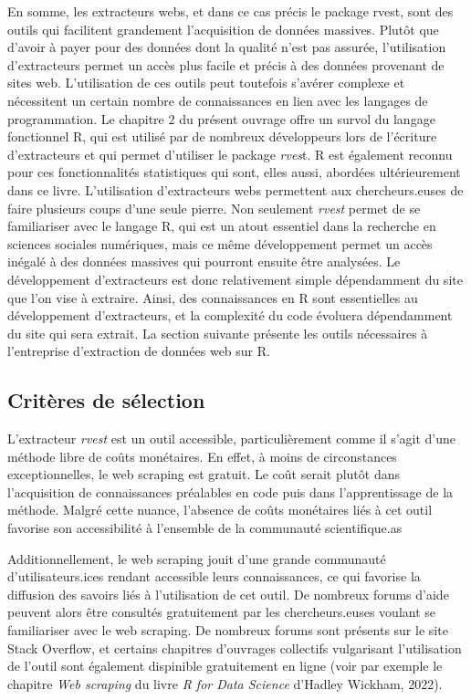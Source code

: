 \documentclass[
  letterpaper,
  DIV=11,
  numbers=noendperiod]{scrreprt}
\begin{document}
En somme, les extracteurs webs, et dans ce cas précis le package rvest,
sont des outils qui facilitent grandement l'acquisition de données
massives. Plutôt que d'avoir à payer pour des données dont la qualité
n'est pas assurée, l'utilisation d'extracteurs permet un accès plus
facile et précis à des données provenant de sites web. L'utilisation de
ces outils peut toutefois s'avérer complexe et nécessitent un certain
nombre de connaissances en lien avec les langages de programmation. Le
chapitre 2 du présent ouvrage offre un survol du langage fonctionnel R,
qui est utilisé par de nombreux développeurs lors de l'écriture
d'extracteurs et qui permet d'utiliser le package \emph{rves}t. R est
également reconnu pour ces fonctionnalités statistiques qui sont, elles
aussi, abordées ultérieurement dans ce livre. L'utilisation
d'extracteurs webs permettent aux chercheurs.euses de faire plusieurs
coups d'une seule pierre. Non seulement \emph{rvest} permet de se
familiariser avec le langage R, qui est un atout essentiel dans la
recherche en sciences sociales numériques, mais ce même développement
permet un accès inégalé à des données massives qui pourront ensuite être
analysées. Le développement d'extracteurs est donc relativement simple
dépendamment du site que l'on vise à extraire. Ainsi, des connaissances
en R sont essentielles au développement d'extracteurs, et la complexité
du code évoluera dépendamment du site qui sera extrait. La section
suivante présente les outils nécessaires à l'entreprise d'extraction de
données web sur R.

\hypertarget{crituxe8res-de-suxe9lection-1}{%
\subsection{Critères de sélection}\label{crituxe8res-de-suxe9lection-1}}

L'extracteur \emph{rvest} est un outil accessible, particulièrement
comme il s'agit d'une méthode libre de coûts monétaires. En effet, à
moins de circonstances exceptionnelles, le web scraping est gratuit. Le
coût serait plutôt dans l'acquisition de connaissances préalables en
code puis dans l'apprentissage de la méthode. Malgré cette nuance,
l'absence de coûts monétaires liés à cet outil favorise son
accessibilité à l'ensemble de la communauté scientifique.as

Additionnellement, le web scraping jouit d'une grande communauté
d'utilisateurs.ices rendant accessible leurs connaissances, ce qui
favorise la diffusion des savoirs liés à l'utilisation de cet outil. De
nombreux forums d'aide peuvent alors être consultés gratuitement par les
chercheurs.euses voulant se familiariser avec le web scraping. De
nombreux forums sont présents sur le site Stack Overflow, et certains
chapitres d'ouvrages collectifs vulgarisant l'utilisation de l'outil
sont également dispinible gratuitement en ligne (voir par exemple le
chapitre \emph{Web scraping} du livre \emph{R for Data Science} d'Hadley
Wickham, 2022).
\end{document}
